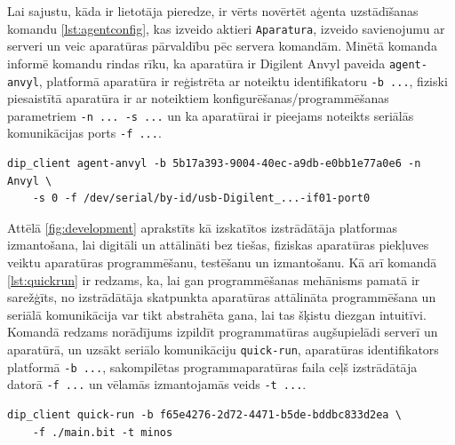 Lai sajustu, kāda ir lietotāja pieredze, ir vērts novērtēt aģenta uzstādīšanas
komandu \ref{lst:agentconfig}, kas izveido aktieri \lstinline!Aparatura!,
izveido savienojumu ar serveri un veic aparatūras pārvaldību pēc servera
komandām. Minētā komanda informē komandu rindas rīku, ka aparatūra ir Digilent
Anvyl paveida \lstinline!agent-anvyl!, platformā aparatūra ir reģistrēta ar noteiktu
identifikatoru \lstinline!-b ...!, fiziski piesaistītā aparatūra ir ar noteiktiem
konfigurēšanas/programmēšanas parametriem \lstinline!-n ... -s ...! un ka aparatūrai ir
pieejams noteikts seriālās komunikācijas ports \lstinline!-f ...!.

\begin{lstlisting}[caption={\gls{dip} aģenta uzstādīšana komandu rindā},label={lst:agentconfig},captionpos=b]
dip_client agent-anvyl -b 5b17a393-9004-40ec-a9db-e0bb1e77a0e6 -n Anvyl \
    -s 0 -f /dev/serial/by-id/usb-Digilent_...-if01-port0
\end{lstlisting}

Attēlā \ref{fig:development} aprakstīts kā izskatītos izstrādātāja platformas
izmantošana, lai digitāli un attālināti bez tiešas, fiziskas aparatūras
piekļuves veiktu aparatūras programmēšanu, testēšanu un izmantošanu. Kā arī
komandā \ref{lst:quickrun} ir redzams, ka, lai gan programmēšanas mehānisms
pamatā ir sarežģīts, no izstrādātāja skatpunkta aparatūras attālināta
programmēšana un seriālā komunikācija var tikt abstrahēta gana, lai tas šķistu
diezgan intuitīvi. Komandā redzams norādījums izpildīt programmatūras
augšupielādi serverī un aparatūrā, un uzsākt seriālo komunikāciju
\lstinline!quick-run!, aparatūras identifikators platformā \lstinline!-b ...!,
sakompilētas programmaparatūras faila ceļš izstrādātāja datorā \lstinline!-f ...!
un vēlamās izmantojamās \glslink{vinterface}{virtuālās saskarnes} veids
\lstinline!-t ...!.

\begin{lstlisting}[caption={Programmaparatūras augšupielāde un seriālās komunikācijas komanda \gls{dip} klientā},label={lst:quickrun},captionpos=b]
dip_client quick-run -b f65e4276-2d72-4471-b5de-bddbc833d2ea \ 
    -f ./main.bit -t minos
\end{lstlisting}

